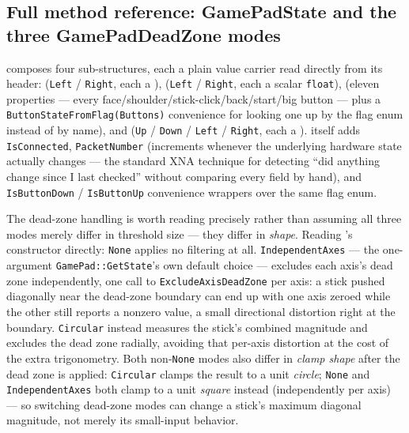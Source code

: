 \subsection{Full method reference: GamePadState and the three GamePadDeadZone modes}

 composes four sub-structures, each a plain value carrier read directly
from its header:  (\texttt{Left} / \texttt{Right}, each a
),  (\texttt{Left} / \texttt{Right}, each a scalar
\texttt{float}),  (eleven  properties --- every
face/shoulder/stick-click/back/start/big button --- plus a \texttt{ButtonStateFromFlag(Buttons)}
convenience for looking one up by the  flag enum instead of by name), and
 (\texttt{Up} / \texttt{Down} / \texttt{Left} / \texttt{Right}, each a
).  itself adds \texttt{IsConnected},
\texttt{PacketNumber} (increments whenever the underlying hardware state actually changes ---
the standard XNA technique for detecting ``did anything change since I last checked'' without
comparing every field by hand), and \texttt{IsButtonDown} / \texttt{IsButtonUp} convenience
wrappers over the same  flag enum.

The dead-zone handling is worth reading precisely rather than assuming all three
 modes merely differ in threshold size --- they differ in
\emph{shape}. Reading 's constructor directly: \texttt{None}
applies no filtering at all. \texttt{IndependentAxes} --- the one-argument
\texttt{GamePad::GetState}'s own default choice --- excludes each axis's dead zone
independently, one call to \texttt{ExcludeAxisDeadZone} per axis: a stick pushed diagonally
near the dead-zone boundary can end up with one axis zeroed while the other still reports a
nonzero value, a small directional distortion right at the boundary. \texttt{Circular} instead
measures the stick's combined magnitude and excludes the dead zone radially, avoiding that
per-axis distortion at the cost of the extra trigonometry. Both non-\texttt{None} modes also
differ in \emph{clamp shape} after the dead zone is applied: \texttt{Circular} clamps the
result to a unit \emph{circle}; \texttt{None} and \texttt{IndependentAxes} both clamp to a unit
\emph{square} instead (independently per axis) --- so switching dead-zone modes can change a
stick's maximum diagonal magnitude, not merely its small-input behavior.

